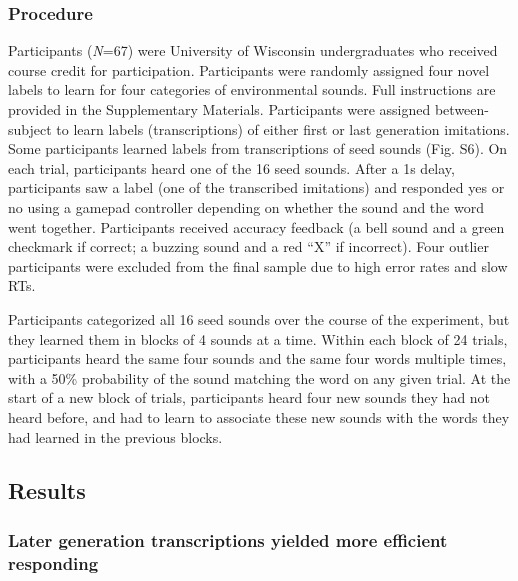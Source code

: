 \documentclass[english,floatsintext,man]{apa6}
\theoremstyle{definition}
\theoremstyle{definition}
\theoremstyle{remark}
\begin{document}
\subsubsection{Procedure}\label{procedure}

Participants (\emph{N}=67) were University of Wisconsin undergraduates
who received course credit for participation. Participants were randomly
assigned four novel labels to learn for four categories of environmental
sounds. Full instructions are provided in the Supplementary Materials.
Participants were assigned between-subject to learn labels
(transcriptions) of either first or last generation imitations. Some
participants learned labels from transcriptions of seed sounds (Fig.
S6). On each trial, participants heard one of the 16 seed sounds. After
a 1s delay, participants saw a label (one of the transcribed imitations)
and responded yes or no using a gamepad controller depending on whether
the sound and the word went together. Participants received accuracy
feedback (a bell sound and a green checkmark if correct; a buzzing sound
and a red \enquote{X} if incorrect). Four outlier participants were
excluded from the final sample due to high error rates and slow RTs.

Participants categorized all 16 seed sounds over the course of the
experiment, but they learned them in blocks of 4 sounds at a time.
Within each block of 24 trials, participants heard the same four sounds
and the same four words multiple times, with a 50\% probability of the
sound matching the word on any given trial. At the start of a new block
of trials, participants heard four new sounds they had not heard before,
and had to learn to associate these new sounds with the words they had
learned in the previous blocks.

\subsection{Results}\label{results-2}

\subsubsection{Later generation transcriptions yielded more efficient
responding}\label{later-generation-transcriptions-yielded-more-efficient-responding}
\end{document}

